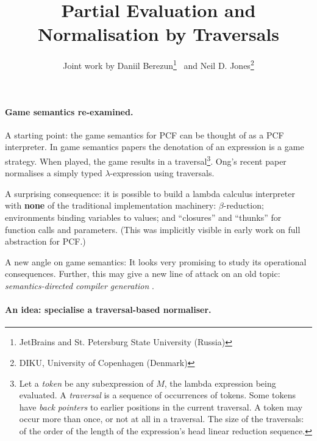 \documentclass{article}
\title{Partial Evaluation and Normalisation by Traversals}
\author {Joint work by Daniil 
Berezun\footnote{JetBrains and St. Petersburg State University (Russia)} \ and Neil D. 
Jones\footnote{DIKU, University of Copenhagen (Denmark)}}
\begin{document}

\setcounter{tocdepth}{3}

\maketitle
\vspace{-6mm}

\paragraph{Game semantics re-examined.}

A starting point: the game semantics for PCF can be thought of as a PCF interpreter. 
In game semantics papers 
\cite{
abramskyMcCusker97,
DBLP:conf/tacs/AbramskyMJ94,
DBLP:journals/iandc/AbramskyO93,
lmcs09,
blumong2008,
DBLP:journals/iandc/HylandO00,
DBLP:journals/tcs/KerNO02,
DBLP:conf/icfp/NeatherwayRO12,
ong2015}
the denotation of an expression is  a game strategy. When played, 
the game results in a 
traversal\footnote{  %
Let a {\em token} be any subexpression of $M$, the lambda expression being evaluated.
A {\em traversal} is a sequence of occurrences of  tokens. 
Some tokens  have {\em back pointers} to earlier positions in the current traversal.  
A token may occur more than once, or not at all in a traversal. 
The size of the traversals: of the order of the length of the expression's head linear reduction sequence. 
}.  %
Ong's recent paper \cite{ong2015} normalises a simply typed $\lambda$-expression using   traversals.

A surprising consequence: it is possible to build a lambda calculus interpreter with {\bf none} of the traditional 
implementation machinery: 
$\beta$-reduction;   environments binding variables to values; and  ``closures'' and  ``thunks''  for  function calls and parameters.
(This was implicitly  visible  in early work on full abstraction for PCF.)

A new angle on game semantics: 
It  looks very promising to study its operational consequences. 
Further, this may give a new line of attack on an old topic: 
{\em semantics-directed compiler generation}
\cite{DBLP:conf/cc/1980,DBLP:conf/cc/Schmidt80}.




\paragraph{An  idea: specialise a traversal-based normaliser.}
\end{document}

